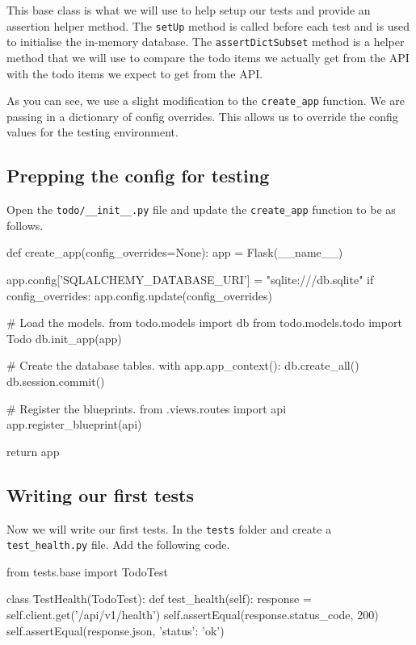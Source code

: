 \documentclass{csse4400}
\begin{document}
This base class is what we will use to help setup our tests and provide an assertion helper method.
The \texttt{setUp} method is called before each test and is used to initialise the in-memory database.
The \texttt{assertDictSubset} method is a helper method that we will use to compare the todo items
we actually get from the API with the todo items we expect to get from the API.

As you can see, we use a slight modification to the \texttt{create\_app} function.
We are passing in a dictionary of config overrides.
This allows us to override the config values for the testing environment.

\subsection{Prepping the config for testing}

Open the \texttt{todo/\_\_init\_\_.py} file and update the \texttt{create\_app} function to be as follows.

\begin{code}[language=python,numbers=none]{}
  def create_app(config_overrides=None):
      app = Flask(__name__)
  
      app.config['SQLALCHEMY_DATABASE_URI'] = "sqlite:///db.sqlite"
      if config_overrides:
          app.config.update(config_overrides)
          
      # Load the models.
      from todo.models import db
      from todo.models.todo import Todo
      db.init_app(app)

      # Create the database tables.
      with app.app_context():
          db.create_all()
          db.session.commit()
  
      # Register the blueprints.
      from .views.routes import api
      app.register_blueprint(api)
  
      return app
\end{code}

\subsection{Writing our first tests}

Now we will write our first tests.
In the \texttt{tests} folder and create a \texttt{test\_health.py} file.
Add the following code.

\begin{code}[language=python,numbers=none]{}
  from tests.base import TodoTest
  
  class TestHealth(TodoTest):
      def test_health(self):
          response = self.client.get('/api/v1/health')
          self.assertEqual(response.status_code, 200)
          self.assertEqual(response.json, {'status': 'ok'})
\end{code}
\end{document}
